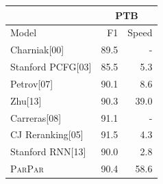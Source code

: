 \documentclass[11pt,letterpaper]{article}
\newcommand{\ParseName}{\textsc{ParPar}}
\begin{document}
\begin{table}
  \centering
  

  \begin{tabular}{|l|rr|}
    \hline
    & \multicolumn{2}{|c|}{PTB} \\
    \hline

    \hline
    Model & F1 & Speed\\
    \hline
    Charniak[00]      &   89.5 &  -  \\
    Stanford PCFG[03]     &   85.5 & 5.3  \\
    Petrov[07]        &   90.1 & 8.6  \\
    Zhu[13]           &   90.3 & 39.0 \\
    Carreras[08]      &   91.1 & -    \\
    CJ Reranking[05]      &   91.5 & 4.3  \\
    Stanford RNN[13]       &   90.0 & 2.8  \\
    \ParseName        &   90.4 & 58.6 \\
    \hline
  \end{tabular}



\end{table}
\end{document}

